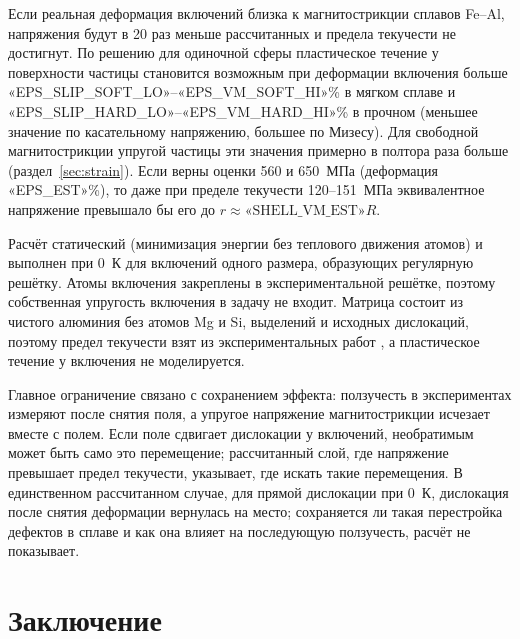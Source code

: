 \documentclass[11pt,a4paper]{article}
\begin{document}
Если реальная деформация включений близка к магнитострикции сплавов
Fe--Al, напряжения будут в 20 раз меньше рассчитанных и предела
текучести не достигнут. По решению для одиночной сферы пластическое
течение у поверхности частицы становится возможным при деформации
включения больше «EPS_SLIP_SOFT_LO»--«EPS_VM_SOFT_HI»\% в мягком сплаве
и «EPS_SLIP_HARD_LO»--«EPS_VM_HARD_HI»\% в прочном (меньшее значение по
касательному напряжению, большее по Мизесу). Для свободной
магнитострикции упругой частицы эти значения примерно в полтора раза
больше (раздел~\ref{sec:strain}). Если верны оценки 560 и 650~МПа
(деформация «EPS_EST»\%), то даже при пределе текучести 120--151~МПа
эквивалентное напряжение превышало бы его до
$r\approx\text{«SHELL_VM_EST»}R$.

Расчёт статический (минимизация энергии без теплового движения атомов)
и выполнен при 0~К для включений одного размера, образующих регулярную
решётку. Атомы включения закреплены в экспериментальной решётке, поэтому
собственная упругость включения в задачу не входит. Матрица состоит из
чистого алюминия без атомов Mg и Si, выделений и исходных дислокаций,
поэтому предел текучести взят из экспериментальных работ
\cite{Friha2024JMMM,Skvortsov2019JAP,Pshonkin2025ZL}, а пластическое
течение у включения не моделируется.

Главное ограничение связано с сохранением эффекта: ползучесть в экспериментах
измеряют после снятия поля, а упругое напряжение магнитострикции
исчезает вместе с полем. Если поле сдвигает дислокации у включений,
необратимым может быть само это перемещение; рассчитанный слой, где
напряжение превышает предел текучести, указывает, где искать такие
перемещения.
В единственном рассчитанном случае, для прямой дислокации при 0~К,
дислокация после снятия деформации вернулась на место; сохраняется ли
такая перестройка дефектов в сплаве и как она влияет на последующую
ползучесть, расчёт не показывает.

\section{Заключение}
\end{document}
